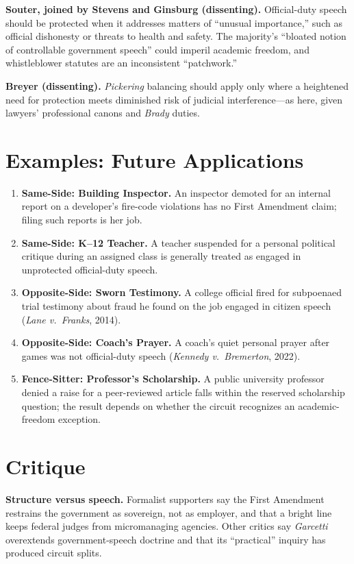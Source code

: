 \documentclass[12pt]{article}
\begin{document}
\textbf{Souter, joined by Stevens and Ginsburg (dissenting).} Official-duty speech should be protected when it addresses matters of ``unusual importance,'' such as official dishonesty or threats to health and safety. The majority's ``bloated notion of controllable government speech'' could imperil academic freedom, and whistleblower statutes are an inconsistent ``patchwork.''

\textbf{Breyer (dissenting).} \textit{Pickering} balancing should apply only where a heightened need for protection meets diminished risk of judicial interference---as here, given lawyers' professional canons and \textit{Brady} duties.

\section{Examples: Future Applications}

\begin{enumerate}
\item \textbf{Same-Side: Building Inspector.} An inspector demoted for an internal report on a developer's fire-code violations has no First Amendment claim; filing such reports is her job.
\item \textbf{Same-Side: K--12 Teacher.} A teacher suspended for a personal political critique during an assigned class is generally treated as engaged in unprotected official-duty speech.
\item \textbf{Opposite-Side: Sworn Testimony.} A college official fired for subpoenaed trial testimony about fraud he found on the job engaged in citizen speech (\textit{Lane v.\ Franks}, 2014).
\item \textbf{Opposite-Side: Coach's Prayer.} A coach's quiet personal prayer after games was not official-duty speech (\textit{Kennedy v.\ Bremerton}, 2022).
\item \textbf{Fence-Sitter: Professor's Scholarship.} A public university professor denied a raise for a peer-reviewed article falls within the reserved scholarship question; the result depends on whether the circuit recognizes an academic-freedom exception.
\end{enumerate}

\section{Critique}

\textbf{Structure versus speech.} Formalist supporters say the First Amendment restrains the government as sovereign, not as employer, and that a bright line keeps federal judges from micromanaging agencies. Other critics say \textit{Garcetti} overextends government-speech doctrine and that its ``practical'' inquiry has produced circuit splits.
\end{document}
